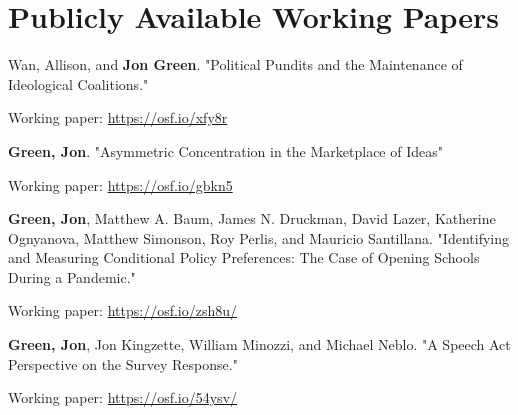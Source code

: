 \documentclass[letterpaper]{article}
\renewenvironment{itemize}{
  \begin{list}{}{
    \setlength{\leftmargin}{1.5em}
  }
}{
  \end{list}
}
\begin{document}




\section*{Publicly Available Working Papers}

\begin{itemize}

\item Wan, Allison, and \textbf{Jon Green}. "Political Pundits and the Maintenance of Ideological Coalitions."
\begin{itemize}
\item Working paper: \url{https://osf.io/xfy8r}
\end{itemize}

\item \textbf{Green, Jon}. "Asymmetric Concentration in the Marketplace of Ideas"
\begin{itemize}
\item Working paper: \url{https://osf.io/gbkn5}
\end{itemize}

\item  \textbf{Green, Jon}, Matthew A. Baum, James N. Druckman, David Lazer, Katherine Ognyanova, Matthew Simonson, Roy Perlis, and Mauricio Santillana. "Identifying and Measuring Conditional Policy Preferences: The Case of Opening Schools During a Pandemic." 
\begin{itemize}
\item Working paper: \url{https://osf.io/zsh8u/}
\end{itemize}

\item \textbf{Green, Jon}, Jon Kingzette, William Minozzi, and Michael Neblo. "A Speech Act Perspective on the Survey Response." 
\begin{itemize}
\item Working paper: \url{https://osf.io/54ysv/}
\end{itemize}


\end{itemize}
\end{document}
